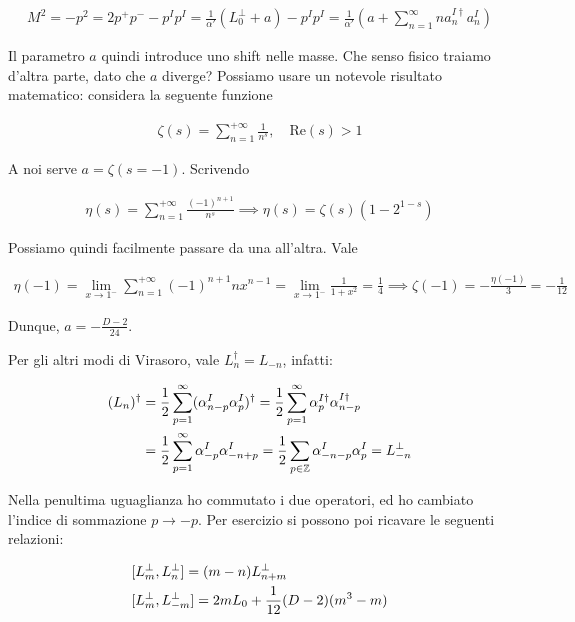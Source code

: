 \documentclass{report}
\begin{document}
\begin{align}
    M^2 = -p^2  = 2p^+p^- - p^I p^I = \frac{1}{\alpha'}(L_0^\perp + a) - p^I p^I = \frac{1}{\alpha'}(a + \sum_{n=1}^\infty n a_n^{I\dagger}a_n^I)
\end{align}

Il parametro \(a\) quindi introduce uno shift nelle masse. Che senso fisico traiamo d'altra parte, dato che \(a\) diverge? Possiamo usare un notevole risultato matematico: considera la seguente funzione 

\begin{align}
    \zeta(s) = \sum_{n=1}^{+\infty} \frac{1}{n^s}, \quad \text{Re}(s) > 1
\end{align}

A noi serve \(a = \zeta(s = -1)\). Scrivendo 

\begin{align}
    \eta(s) = \sum_{n=1}^{+\infty} \frac{(-1)^{n+1}}{n^s} \implies \eta(s) = \zeta(s)(1-2^{1-s})
\end{align}

Possiamo quindi facilmente passare da una all'altra. Vale 

\begin{align}
    \eta(-1) = \lim_{x\to 1^-} \sum_{n=1}^{+\infty} (-1)^{n+1} n x^{n-1} = \lim_{x \to 1^-}\frac{1}{1+x^2} = \frac{1}{4} \implies \zeta(-1) = -\frac{\eta(-1)}{3} = -\frac{1}{12}
\end{align}

Dunque, \(a = -\frac{D-2}{24}\). 

Per gli altri modi di Virasoro, vale \(L^\dagger_n = L_{-n}\), infatti: 

\begin{align}
    (L_n)^\dagger &= \frac{1}{2}\sum_{p=1}^\infty (\alpha_{n-p}^I \alpha_p^I)^\dagger = \frac{1}{2}\sum_{p=1}^\infty \alpha_p^{I \dagger} \alpha_{n-p}^{I\dagger}  \notag \\
    &= \frac{1}{2}\sum_{p=1}^\infty \alpha^I_{-p}\alpha^I_{-n+p} = \frac{1}{2}\sum_{p\in \mathbb{Z}} \alpha_{-n-p}^I \alpha_p^I = L_{-n}^\perp
\end{align}

Nella penultima uguaglianza ho commutato i due operatori, ed ho cambiato l'indice di sommazione \(p \to -p\). Per esercizio si possono poi ricavare le seguenti relazioni: 

\begin{align}
    &[L_m^\perp, L_n^\perp] = (m-n)L^\perp_{n+m} \notag \\
    &[L_m^\perp, L_{-m}^\perp] = 2mL_0 +\frac{1}{12}(D-2)(m^3 -m)
\end{align}
\end{document}
